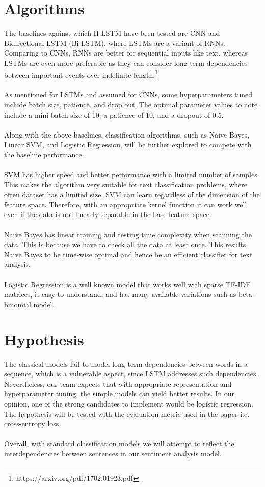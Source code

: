 \documentclass[comsoc,conference]{IEEEtran}
\begin{document}
\section{Algorithms}
\vspace{5px} \noindent 
The baselines against which H-LSTM have been tested are CNN and Bidirectional LSTM (Bi-LSTM), where LSTMs are a variant of RNNs. Comparing to CNNs, RNNs are better for sequential inputs like text, whereas LSTMs are even more preferable as they can consider long term dependencies between important events over indefinite length.\footnote{\label{} https://arxiv.org/pdf/1702.01923.pdf} 
\\
\\ As mentioned for LSTMs and assumed for CNNs, some hyperparameters tuned include batch size, patience, and drop out. The optimal parameter values to note include a mini-batch size of 10, a patience of 10, and a dropout of 0.5.
\\
\\ Along with the above baselines, classification algorithms, such as Naive Bayes, Linear SVM, and Logistic Regression, will be further explored to compete with the baseline performance. 
\\
\\ SVM has higher speed and better performance with a limited number of samples. This makes the algorithm very suitable for text classification problems, where often dataset has a limited size. SVM can learn regardless of the dimension of the feature space. Therefore, with an appropriate kernel function it can work well even if the data is not linearly separable in the base feature space.
\\
\\ Naive Bayes has linear training and testing time complexity when scanning the data. This is because we have to check all the data at least once. This results Naive Bayes to be time-wise optimal and hence be an efficient classifier for text analysis. 
\\
\\ Logistic Regression is a well known model that works well with sparse TF-IDF matrices, is easy to understand, and has many available variations such as beta-binomial model.

\section{Hypothesis}
\vspace{5px} \noindent 
The classical models fail to model long-term dependencies between words in a sequence, which is a vulnerable aspect, since LSTM addresses such dependencies. Nevertheless, our team expects that with appropriate representation and hyperparameter tuning, the simple models can yield better results. In our opinion, one of the strong candidates to implement would be logistic regression. The hypothesis will be tested with the evaluation metric used in the paper i.e. cross-entropy loss. 
\\
\\ Overall, with standard classification models we will attempt to reflect the interdependencies between sentences in our sentiment analysis model.
\end{document}
